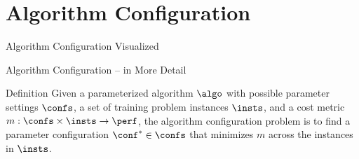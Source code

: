 \section{Algorithm Configuration} 

\begin{frame}[c]{Algorithm Configuration Visualized}

\centering
{}

\end{frame}


\begin{frame}[c]{Algorithm Configuration -- in More Detail}

\bigskip

\centering
\scalebox{0.75}{

}

\bigskip

\begin{block}{Definition}
Given a parameterized algorithm $\algo$ with possible parameter settings $\confs$, \pause 
a set of training problem instances $\insts$, \pause 
and a cost metric $m: \confs \times \insts \rightarrow \perf$, \pause 
the algorithm configuration problem is 
to \alert{find a parameter configuration $\conf^* \in \confs$ 
that minimizes $m$ across the instances in $\insts$}.
\end{block}

\end{frame}


